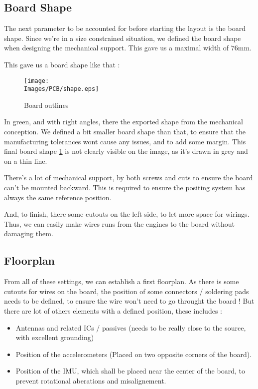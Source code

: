 \subsection{Board Shape}
The next parameter to be accounted for before starting the layout is the board
shape. Since we're in a size constrained situation, we defined the board shape
when designing the mechanical support. This gave us a maximal width of $76
    \si{\milli\meter}$.

This gave us a board shape like that :

\begin{figure}
    \centering
    \texttt{[image: \\Images/PCB/shape.eps]}
    \caption{Board outlines}\label{img:board_shape}
\end{figure}

In green, and with right angles, there the exported shape from the mechanical
conception. We defined a bit smaller board shape than that, to ensure that the
manufacturing tolerances wont cause any issues, and to add some margin. This
final board shape \ref{img:board_shape} is not clearly visible on the image, as
it's drawn in grey and on a thin line.

There's a lot of mechanical support, by both screws and cuts to ensure the
board can't be mounted backward. This is required to ensure the positing system
has always the same reference position.

And, to finish, there some cutouts on the left side, to let more space for
wirings. Thus, we can easily make wires runs from the engines to the board
without damaging them.

\FloatBarrier

\subsection{Floorplan}
From all of these settings, we can establish a first floorplan. As there is
some cutouts for wires on the board, the position of some connectors /
soldering pads needs to be defined, to ensure the wire won't need to go
throught the board ! But there are lot of others elements with a defined
position, these includes :

\begin{itemize}[noitemsep]
    \item   Antennas and related ICs / passives (needs to be really close to the source,
          with excellent grounding)
    \item   Position of the accelerometers (Placed on two opposite corners of the board).
    \item   Position of the IMU, which shall be placed near the center of the board, to
          prevent rotational aberations and misalignement.
\end{itemize}